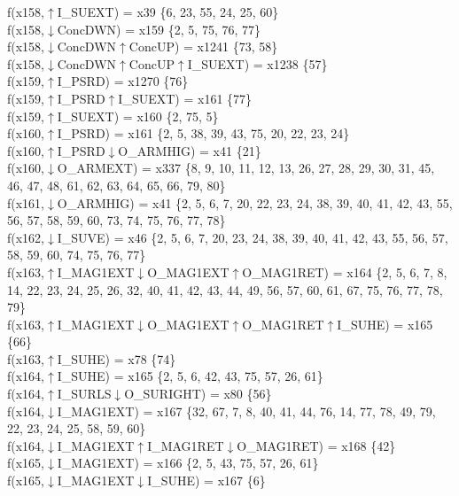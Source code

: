 f(x158,$\uparrow$I\_SUEXT) = x39 \{6, 23, 55, 24, 25, 60\} \\  
f(x158,$\downarrow$ConcDWN) = x159 \{2, 5, 75, 76, 77\} \\  
f(x158,$\downarrow$ConcDWN$\uparrow$ConcUP) = x1241 \{73, 58\} \\  
f(x158,$\downarrow$ConcDWN$\uparrow$ConcUP$\uparrow$I\_SUEXT) = x1238 \{57\} \\  
f(x159,$\uparrow$I\_PSRD) = x1270 \{76\} \\  
f(x159,$\uparrow$I\_PSRD$\uparrow$I\_SUEXT) = x161 \{77\} \\  
f(x159,$\uparrow$I\_SUEXT) = x160 \{2, 75, 5\} \\  
f(x160,$\uparrow$I\_PSRD) = x161 \{2, 5, 38, 39, 43, 75, 20, 22, 23, 24\} \\  
f(x160,$\uparrow$I\_PSRD$\downarrow$O\_ARMHIG) = x41 \{21\} \\  
f(x160,$\downarrow$O\_ARMEXT) = x337 \{8, 9, 10, 11, 12, 13, 26, 27, 28, 29, 30, 31, 45, 46, 47, 48, 61, 62, 63, 64, 65, 66, 79, 80\} \\  
f(x161,$\downarrow$O\_ARMHIG) = x41 \{2, 5, 6, 7, 20, 22, 23, 24, 38, 39, 40, 41, 42, 43, 55, 56, 57, 58, 59, 60, 73, 74, 75, 76, 77, 78\} \\  
f(x162,$\downarrow$I\_SUVE) = x46 \{2, 5, 6, 7, 20, 23, 24, 38, 39, 40, 41, 42, 43, 55, 56, 57, 58, 59, 60, 74, 75, 76, 77\} \\  
f(x163,$\uparrow$I\_MAG1EXT$\downarrow$O\_MAG1EXT$\uparrow$O\_MAG1RET) = x164 \{2, 5, 6, 7, 8, 14, 22, 23, 24, 25, 26, 32, 40, 41, 42, 43, 44, 49, 56, 57, 60, 61, 67, 75, 76, 77, 78, 79\} \\  
f(x163,$\uparrow$I\_MAG1EXT$\downarrow$O\_MAG1EXT$\uparrow$O\_MAG1RET$\uparrow$I\_SUHE) = x165 \{66\} \\  
f(x163,$\uparrow$I\_SUHE) = x78 \{74\} \\  
f(x164,$\uparrow$I\_SUHE) = x165 \{2, 5, 6, 42, 43, 75, 57, 26, 61\} \\  
f(x164,$\uparrow$I\_SURLS$\downarrow$O\_SURIGHT) = x80 \{56\} \\  
f(x164,$\downarrow$I\_MAG1EXT) = x167 \{32, 67, 7, 8, 40, 41, 44, 76, 14, 77, 78, 49, 79, 22, 23, 24, 25, 58, 59, 60\} \\  
f(x164,$\downarrow$I\_MAG1EXT$\uparrow$I\_MAG1RET$\downarrow$O\_MAG1RET) = x168 \{42\} \\  
f(x165,$\downarrow$I\_MAG1EXT) = x166 \{2, 5, 43, 75, 57, 26, 61\} \\  
f(x165,$\downarrow$I\_MAG1EXT$\downarrow$I\_SUHE) = x167 \{6\} \\  
